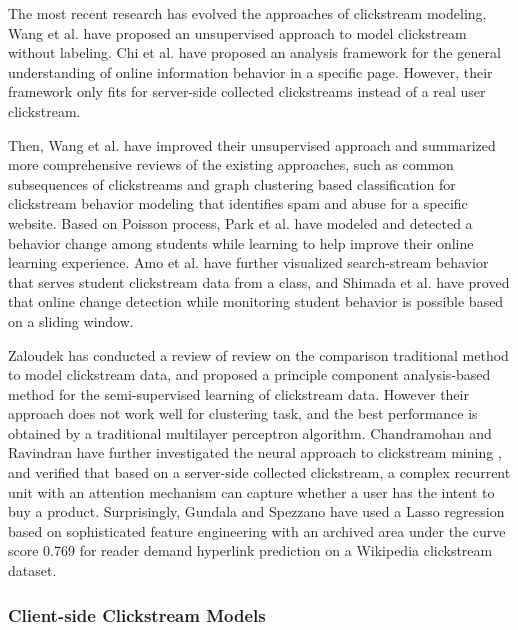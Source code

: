 The most recent research has evolved the approaches of clickstream modeling,
Wang et al.\cite{Wang:2016:UCC:2858036.2858107} have proposed an unsupervised approach 
to model clickstream without labeling.
Chi et al. have proposed an analysis framework \cite{chi2017towards} for the general understanding 
of online information behavior in a specific page. 
However, their framework only fits for server-side collected clickstreams instead of 
a real user clickstream.

Then, Wang et al. \cite{Wang:2017:CUB:3127338.3068332} have improved their unsupervised approach
and summarized more comprehensive reviews of the existing approaches, 
such as common subsequences of clickstreams and graph clustering based classification 
for clickstream behavior modeling that identifies spam and abuse for a specific website. 
Based on Poisson process, Park et al. have modeled and detected a behavior change 
among students while learning \cite{Park:2017:DCS:3027385.3027430} to
help improve their online learning experience. Amo et al. \cite{amo2018learning} have 
further visualized search-stream behavior that serves student clickstream data from a class, 
and Shimada et al. have proved \cite{Shimada:2018:OCD:3170358.3170412} that
online change detection while monitoring student behavior is possible based on a sliding window.

Zaloudek has conducted a review of review on the comparison \cite{mastersthesis} traditional method 
to model clickstream data, and proposed a principle component analysis-based method for 
the semi-supervised learning of clickstream data. 
However their approach does not work well for clustering task, and 
the best performance is obtained by a traditional multilayer perceptron algorithm.
Chandramohan and Ravindran have further investigated the neural approach to 
clickstream mining \cite{N:2018:NAB:3152494.3152505},
and verified that based on a server-side collected clickstream, a complex recurrent unit 
with an attention mechanism can capture whether a user
has the intent to buy a product.
Surprisingly, Gundala and Spezzano \cite{Gundala:2018:RDH:3184558.3191644} have used a Lasso
regression based on sophisticated feature engineering with an 
archived area under the curve score 0.769 for reader demand hyperlink prediction 
on a Wikipedia clickstream dataset.

\subsubsection{Client-side Clickstream Models}

